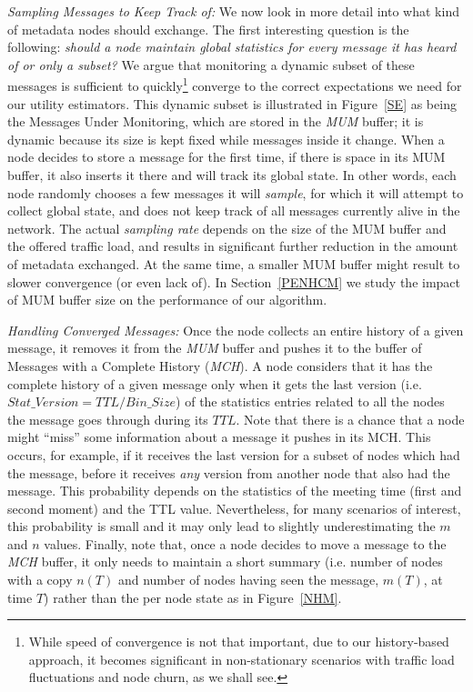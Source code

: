 \emph{Sampling Messages to Keep Track of:} We now look in more detail into what kind of metadata nodes should exchange. The first interesting question is the following: \emph{should a node maintain global statistics for \emph{every} message it has heard of or only a subset?} We argue that monitoring a dynamic subset of these messages is sufficient to quickly\footnote{While speed of convergence is not that important, due to our history-based approach, it becomes significant in non-stationary scenarios with traffic load fluctuations and node churn, as we shall see.} converge to the correct expectations we need for our utility estimators. This dynamic subset is illustrated in Figure~\ref{SE} as being the Messages Under Monitoring, which are stored in the \emph{MUM} buffer; it is dynamic because its size is kept fixed while messages inside it change. When a node decides to store a message for the first time, if there is space in its MUM buffer, it also inserts it there and will track its global state.  In other words, each node randomly chooses a few messages it will \emph{sample}, for which it will attempt to collect global state, and does not keep track of all messages currently alive in the network. The actual \emph{sampling rate} depends on the size of the MUM buffer and the offered traffic load, and results in significant further reduction in the amount of metadata exchanged. At the same time, a smaller MUM buffer might result to slower convergence (or even lack of). In Section~\ref{PENHCM} we study the impact of MUM buffer size on the performance of our algorithm.

\emph{Handling Converged Messages:} Once the node collects an entire history of a given message, it removes it from the \emph{MUM} buffer and pushes it to the buffer of Messages with a Complete History (\emph{MCH}). A node considers that it has the complete history of a given message only when it gets the last version (i.e. $Stat\_Version = TTL/Bin\_Size$) of the statistics entries related to all the nodes the message goes through during its $TTL$. Note that there is a chance that a node might ``miss'' some information about a message it pushes in its MCH. This occurs, for example, if it receives the last version for a subset of nodes which had the message, before it receives \emph{any} version from another node that also had the message. This probability depends on the statistics of the meeting time (first and second moment) and the TTL value. Nevertheless, for many scenarios of interest, this probability is small and it may only lead to slightly underestimating the $m$ and $n$ values. Finally, note that, once a node decides to move a message to the \emph{MCH} buffer, it only needs to maintain a short summary (i.e. number of nodes with a copy $n(T)$ and number of nodes having seen the message, $m(T)$, at time $T$) rather than the per node state as in  Figure~\ref{NHM}.

